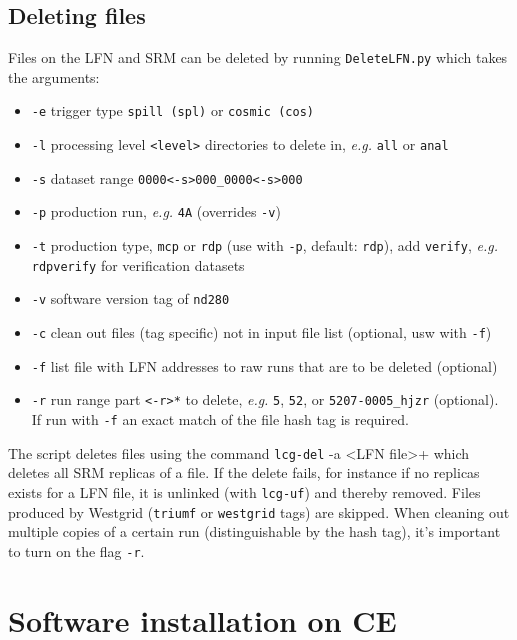 \documentclass[11pt]{article}
\begin{document}
\subsection{Deleting files}
Files on the LFN and SRM can be deleted by running \verb+DeleteLFN.py+ which takes the arguments:
\begin{itemize}
\item \verb+-e+ trigger type \verb+spill (spl)+ or \verb+cosmic (cos)+
\item \verb+-l+ processing level \verb+<level>+ directories to delete in, \textit{e.g.}
 \verb+all+ or \verb+anal+
\item \verb+-s+ dataset range \verb+0000<-s>000_0000<-s>000+
\item \verb+-p+ production run, \textit{e.g.} \verb+4A+ (overrides \verb+-v+)
\item \verb+-t+ production type, \verb+mcp+ or \verb+rdp+ (use with \verb+-p+, default: \verb+rdp+), add \verb+verify+, \textit{e.g.} \verb+rdpverify+ for verification datasets
\item \verb+-v+ software version tag of \verb+nd280+
\item \verb+-c+ clean out files (tag specific) not in input file list (optional, usw with \verb+-f+)
\item \verb+-f+ list file with LFN addresses to raw runs that are to be deleted (optional)
\item \verb+-r+ run range part \verb+<-r>*+ to delete, \textit{e.g.} \verb+5+, \verb+52+, or \verb+5207-0005_hjzr+ (optional). If run with \verb+-f+ an exact match of the file hash tag is required.
\end{itemize}

The script deletes files using the command \verb+lcg-del+ -a <LFN
file>+ which deletes all SRM replicas of a file. If the delete fails,
for instance if no replicas exists for a LFN file, it is unlinked
(with \verb+lcg-uf+) and thereby removed. Files produced by Westgrid
(\verb+triumf+ or \verb+westgrid+ tags) are skipped. When cleaning out
multiple copies of a certain run (distinguishable by the hash tag),
it's important to turn on the flag \verb+-r+.

\clearpage
\section{Software installation on CE}
\label{sec:software}
\end{document}
